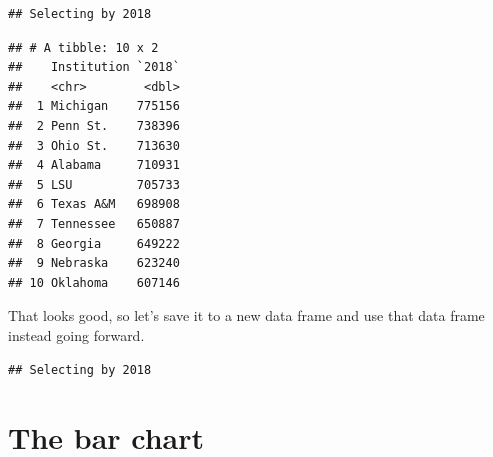 \documentclass[
]{book}
\newenvironment{Shaded}{\begin{snugshade}}{\end{snugshade}}
\newcommand{\DataTypeTok}[1]{\textcolor[rgb]{0.13,0.29,0.53}{#1}}
\newcommand{\DecValTok}[1]{\textcolor[rgb]{0.00,0.00,0.81}{#1}}
\newcommand{\KeywordTok}[1]{\textcolor[rgb]{0.13,0.29,0.53}{\textbf{#1}}}
\newcommand{\NormalTok}[1]{#1}
\newcommand{\OperatorTok}[1]{\textcolor[rgb]{0.81,0.36,0.00}{\textbf{#1}}}
\newcommand{\StringTok}[1]{\textcolor[rgb]{0.31,0.60,0.02}{#1}}
\begin{document}
\begin{Shaded}
\end{Shaded}

\begin{verbatim}
## Selecting by 2018
\end{verbatim}

\begin{verbatim}
## # A tibble: 10 x 2
##    Institution `2018`
##    <chr>        <dbl>
##  1 Michigan    775156
##  2 Penn St.    738396
##  3 Ohio St.    713630
##  4 Alabama     710931
##  5 LSU         705733
##  6 Texas A&M   698908
##  7 Tennessee   650887
##  8 Georgia     649222
##  9 Nebraska    623240
## 10 Oklahoma    607146
\end{verbatim}

That looks good, so let's save it to a new data frame and use that data frame instead going forward.

\begin{Shaded}
\end{Shaded}

\begin{verbatim}
## Selecting by 2018
\end{verbatim}

\hypertarget{the-bar-chart}{%
\section{The bar chart}\label{the-bar-chart}}
\end{document}
